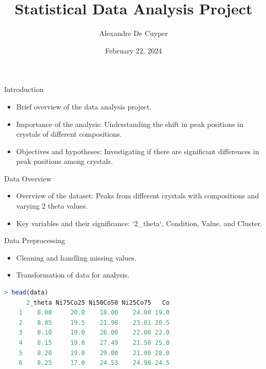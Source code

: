 \documentclass{beamer}
\title{Statistical Data Analysis Project}
\author{Alexandre De Cuyper}
\date{February 22, 2024}
\institute{University of A Coruña}
\begin{document}
\frame{\titlepage}

\begin{frame}{Introduction}
    \begin{itemize}
        \item Brief overview of the data analysis project.
        \item Importance of the analysis: Understanding the shift in peak positions in crystals of different compositions.
        \item Objectives and hypotheses: Investigating if there are significant differences in peak positions among crystals.
    \end{itemize}
\end{frame}

\begin{frame}{Data Overview}
    \begin{itemize}
        \item Overview of the dataset: Peaks from different crystals with compositions and varying 2 theta values.
        \item Key variables and their significance: `2_theta`, Condition, Value, and Cluster.
    \end{itemize}
\end{frame}

\begin{frame}[fragile]{Data Preprocessing}
    \begin{itemize}
        \item Cleaning and handling missing values.
        \item Transformation of data for analysis.
    \end{itemize}

    \begin{lstlisting}[language=R]
    > head(data)
      2_theta Ni75Co25 Ni50Co50 Ni25Co75   Co
    1    8.00     20.0    18.00    24.00 19.0
    2    8.05     19.5    21.98    23.01 20.5
    3    8.10     19.0    26.00    22.00 22.0
    4    8.15     19.0    27.49    21.50 25.0
    5    8.20     19.0    29.00    21.00 28.0
    6    8.25     17.0    24.53    24.98 24.5
    \end{lstlisting}
\end{frame}
\end{document}
